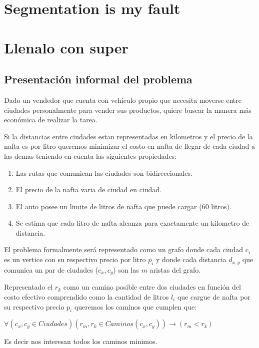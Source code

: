 \documentclass[12pt]{article}
\begin{document}
\section{Segmentation is my fault}




\section{Llenalo con super}

\subsection{Presentación informal del problema}
Dado un vendedor que cuenta con vehiculo propio que necesita moverse entre ciudades personalmente para vender sus productos, quiere buscar la manera más económica de realizar la tarea.

Si la distancias entre ciudades estan representadas en kilometros y el precio de la nafta es por litro queremos minimizar el costo en nafta de llegar de cada ciudad a las demas teniendo en cuenta las siguientes propiedades: 

\begin{enumerate}
	\item Las rutas que comunican las ciudades son bidireccionales.
	\item El precio de la nafta varia de ciudad en ciudad.
	\item El auto posee un limite de litros de nafta que puede cargar (60 litros).
	\item Se estima que cada litro de nafta alcanza para exactamente un kilometro de distancia.
\end{enumerate}

El problema formalmente será representado como un grafo donde cada ciudad $c_i$ es un vertice con su respectivo precio por litro $p_i$ y donde cada distancia $d_{x,y}$ que comunica un par de ciudades ($c_x, c_y$) son las $m$ aristas del grafo.

Representado el $r_k$ como un camino posible entre dos ciudades en función del costo efectivo comprendido como la cantidad de litros $l_i$ que cargue de nafta por su respectivo precio $p_i$ queremos los caminos que cumplen que:

$\forall(c_x, c_y \in Ciudades)(r_{m}, r_k \in Caminos(c_x,c_y))\rightarrow(r_{m} < r_k)$

Es decir nos interesan todos los caminos minimos.
\end{document}
